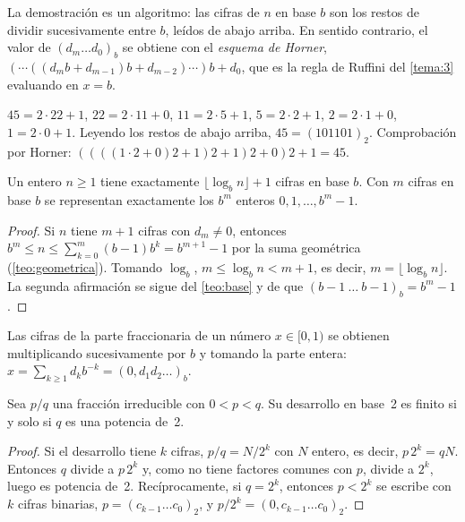La demostración es un algoritmo: las cifras de $n$ en base $b$ son los restos de dividir sucesivamente entre $b$, leídos de abajo arriba. En sentido contrario, el valor de $(d_m\dots d_0)_b$ se obtiene con el \emph{esquema de Horner}, $(\cdots((d_mb+d_{m-1})b+d_{m-2})\cdots)b+d_0$, que es la regla de Ruffini del \cref{tema:3} evaluando en $x=b$.

\begin{ejemplo}\label{ej:conversion}
$45=2\cdot22+1$, $22=2\cdot11+0$, $11=2\cdot5+1$, $5=2\cdot2+1$, $2=2\cdot1+0$, $1=2\cdot0+1$. Leyendo los restos de abajo arriba, $45=(101101)_2$. Comprobación por Horner: $((((1\cdot2+0)2+1)2+1)2+0)2+1=45$.
\end{ejemplo}

\begin{proposicion}\label{prop:cifras}
Un entero $n\ge1$ tiene exactamente $\lfloor\log_bn\rfloor+1$ cifras en base $b$. Con $m$ cifras en base $b$ se representan exactamente los $b^m$ enteros $0,1,\dots,b^m-1$.
\end{proposicion}

\begin{proof}
Si $n$ tiene $m+1$ cifras con $d_m\neq0$, entonces $b^m\le n\le\sum_{k=0}^{m}(b-1)b^k=b^{m+1}-1$ por la suma geométrica (\cref{teo:geometrica}). Tomando $\log_b$, $m\le\log_bn<m+1$, es decir, $m=\lfloor\log_bn\rfloor$. La segunda afirmación se sigue del \cref{teo:base} y de que $(b-1\ \dots\ b-1)_b=b^m-1$.
\end{proof}

Las cifras de la parte fraccionaria de un número $x\in[0,1)$ se obtienen multiplicando sucesivamente por $b$ y tomando la parte entera: $x=\sum_{k\ge1}d_kb^{-k}=(0{,}d_1d_2\dots)_b$.

\begin{proposicion}\label{prop:fraccion-binaria}
Sea $p/q$ una fracción irreducible con $0<p<q$. Su desarrollo en base~2 es finito si y solo si $q$ es una potencia de~2.
\end{proposicion}

\begin{proof}
Si el desarrollo tiene $k$ cifras, $p/q=N/2^k$ con $N$ entero, es decir, $p\,2^k=qN$. Entonces $q$ divide a $p\,2^k$ y, como no tiene factores comunes con $p$, divide a $2^k$, luego es potencia de~2. Recíprocamente, si $q=2^k$, entonces $p<2^k$ se escribe con $k$ cifras binarias, $p=(c_{k-1}\dots c_0)_2$, y $p/2^k=(0{,}c_{k-1}\dots c_0)_2$.
\end{proof}

